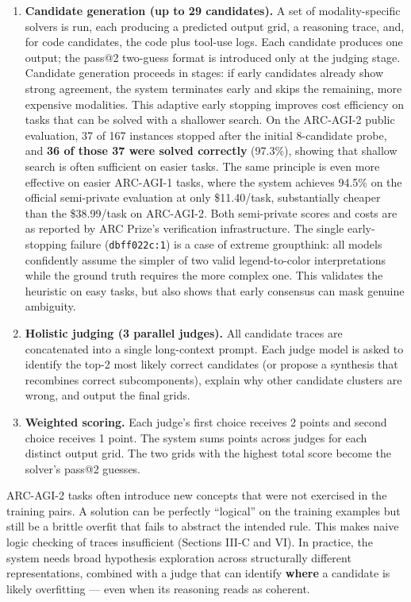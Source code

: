 \documentclass[conference]{IEEEtran}
\begin{document}
\begin{enumerate}
\def\labelenumi{\arabic{enumi}.}
\item
  \textbf{Candidate generation (up to 29 candidates).} A set of
  modality-specific solvers is run, each producing a predicted output
  grid, a reasoning trace, and, for code candidates, the code plus
  tool-use logs. Each candidate produces one output; the pass@2
  two-guess format is introduced only at the judging stage. Candidate
  generation proceeds in stages: if early candidates already show strong
  agreement, the system terminates early and skips the remaining, more
  expensive modalities. This adaptive early stopping improves cost
  efficiency on tasks that can be solved with a shallower search. On the
  ARC-AGI-2 public evaluation, 37 of 167 instances stopped after the
  initial 8-candidate probe, and \textbf{36 of those 37 were solved
  correctly} (97.3\%), showing that shallow search is often sufficient
  on easier tasks. The same principle is even more effective on easier
  ARC-AGI-1 tasks, where the system achieves 94.5\% on the official
  semi-private evaluation at only \$11.40/task, substantially cheaper
  than the \$38.99/task on ARC-AGI-2. Both semi-private scores and costs
  are as reported by ARC Prize's verification infrastructure. The single
  early-stopping failure (\texttt{dbff022c:1}) is a case of extreme
  groupthink: all models confidently assume the simpler of two valid
  legend-to-color interpretations while the ground truth requires the
  more complex one. This validates the heuristic on easy tasks, but also
  shows that early consensus can mask genuine ambiguity.
\item
  \textbf{Holistic judging (3 parallel judges).} All candidate traces
  are concatenated into a single long-context prompt. Each judge model
  is asked to identify the top-2 most likely correct candidates (or
  propose a synthesis that recombines correct subcomponents), explain
  why other candidate clusters are wrong, and output the final grids.
\item
  \textbf{Weighted scoring.} Each judge's first choice receives 2 points
  and second choice receives 1 point. The system sums points across
  judges for each distinct output grid. The two grids with the highest
  total score become the solver's pass@2 guesses.
\end{enumerate}

ARC-AGI-2 tasks often introduce new concepts that were not exercised in
the training pairs. A solution can be perfectly ``logical'' on the
training examples but still be a brittle overfit that fails to abstract
the intended rule. This makes naive logic checking of traces
insufficient (Sections III-C and VI). In practice, the system needs
broad hypothesis exploration across structurally different
representations, combined with a judge that can identify \textbf{where}
a candidate is likely overfitting --- even when its reasoning reads as
coherent.
\end{document}

